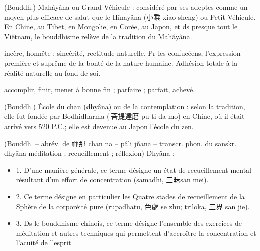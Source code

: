 \begin{Def}[dasheng 大乘]
    (Bouddh.) Mahâyâna ou Grand Véhicule : considéré par ses adeptes comme un moyen plus efficace de salut que le Hînayâna (小乘 xiao sheng) ou Petit Véhicule. En Chine, au Tibet, en Mongolie, en Corée, au Japon, et ds presque tout le Viêtnam, le bouddhisme relève de la tradition du Mahâyâna.
\end{Def}
\begin{Def}[cheng 誠]
    incère, honnête ; sincérité, rectitude naturelle. Pr les confucéens, l’expression première et suprême de la bonté de la nature humaine. Adhésion totale à la réalité naturelle au fond de soi. 
\end{Def}

\begin{Def}[cheng 成]
    accomplir, finir, mener à bonne fin ; parfaire ; parfait, achevé.
\end{Def}
\begin{Def}[chanzong 禪宗]
    (Bouddh.) École du chan (dhyâna) ou de la contemplation : selon la tradition, elle fut fondée par Bodhidharma ( 菩提達磨 pu ti da mo) en Chine, où il était arrivé vers 520 P.C.; elle est devenue au Japon l’école du zen.
\end{Def}
\begin{Def}[chan 禪]
    (Bouddh. – abrév. de 禪那 chan na – pâli jñāna – transcr. phon. du sanskr. dhyāna méditation ; recueillement ; réflexion) Dhyâna :	\begin{itemize}
        \item 1. D’une manière générale, ce terme désigne un état de recueillement mental résultant d’un effort de concentration (samādhi, 三昧san mei).  
        \item 2. Ce terme désigne en particulier les Quatre stades de recueillement de la Sphère de la corporéité pure (rūpadhātu, 色處 se zhu; triloka, 三界 san jie).  
        \item 3. Ds le bouddhisme chinois, ce terme désigne l’ensemble des exercices de méditation et autres techniques qui permettent d’accroître la concentration et l’acuité de l’esprit. 
    \end{itemize}
    
\end{Def}

